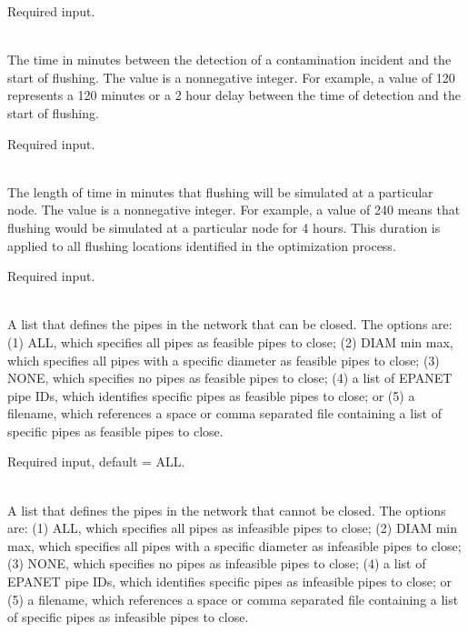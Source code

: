 \begin{description}[topsep=0pt,parsep=0.5em,itemsep=-0.4em]
\begin{description}[topsep=0pt,parsep=0.5em,itemsep=-0.4em]
\begin{description}[topsep=0pt,parsep=0.5em,itemsep=-0.4em]
                Required input.
      \item[{response time}]\hfill
\\The time in minutes between the detection of a contamination incident and 
                the start of flushing. The value is a nonnegative integer. For example, 
                a value of 120 represents a 120 minutes or a 2 hour delay between 
                the time of detection and the start of flushing.
                
                Required input.
      \item[{duration}]\hfill
\\The length of time in minutes that flushing will be simulated at a particular node. 
                The value is a nonnegative integer. For example, a value of 240 means that  
                flushing would be simulated at a particular node for 4 hours. This duration 
                is applied to all flushing locations identified in the optimization process.
                
                Required input.
    \end{description}
    \item[{close valves}]\hfill
    \begin{description}[topsep=0pt,parsep=0.5em,itemsep=-0.4em]
      \item[{feasible pipes}]\hfill
\\A list that defines the pipes in the network that can be closed. 
                The options are: (1) ALL, which specifies all pipes as feasible pipes to close;
                (2) DIAM min max, which specifies all pipes with a specific diameter as feasible pipes to close;
                (3) NONE, which specifies no pipes as feasible pipes to close;
                (4) a list of EPANET pipe IDs, which identifies specific pipes as feasible pipes to close; or
                (5) a filename, which references a space or comma separated file containing a list of 
                specific pipes as feasible pipes to close. 
                
                Required input, default = ALL.
      \item[{infeasible pipes}]\hfill
\\A list that defines the pipes in the network that cannot be closed. 
                The options are: (1) ALL, which specifies all pipes as infeasible pipes to close;
                (2) DIAM min max, which specifies all pipes with a specific diameter as infeasible pipes to close;
                (3) NONE, which specifies no pipes as infeasible pipes to close;
                (4) a list of EPANET pipe IDs, which identifies specific pipes as infeasible pipes to close; or
                (5) a filename, which references a space or comma separated file containing a list of 
                specific pipes as infeasible pipes to close. 
                

\end{description}
\end{description}
\end{description}
